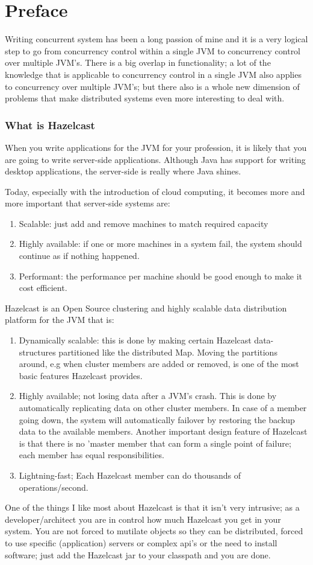 \chapter*{Preface}
Writing concurrent system has been a long passion of mine and it is a very logical step to go from concurrency control within a single JVM to concurrency control over multiple JVM's. There is a big overlap in functionality; a lot of the knowledge that is applicable to concurrency control in a single JVM also applies to concurrency over multiple JVM's; but there also is a whole new dimension of problems that make distributed systems even more interesting to deal with. 
\subsection*{What is Hazelcast}
When you write applications for the JVM for your profession, it is likely that you are going to write server-side applications. Although Java has support for writing desktop applications, the server-side is really where Java shines.

Today, especially with the introduction of cloud computing, it becomes more and more important that server-side systems are:
\begin{enumerate}
\item Scalable: just add and remove machines to match required capacity 
\item Highly available: if one or more machines in a system fail, the system should continue as if nothing happened.
\item Performant: the performance per machine should be good enough to make it cost efficient.
\end{enumerate}

Hazelcast is an Open Source clustering and highly scalable data distribution platform for the JVM that is:
\begin{enumerate}
\item Dynamically scalable: this is done by making certain Hazelcast data-structures partitioned like the distributed Map. Moving the partitions around, e.g when cluster members are added or removed, is one of the most basic features Hazelcast provides. 
\item Highly available; not losing data after a JVM's crash. This is done by automatically replicating data on other cluster members. In case of a member going down, the system will automatically failover by restoring the backup data to the available members. Another important design feature of Hazelcast is that there is no 'master member that can form a single point of failure; each member has equal responsibilities.
\item Lightning-fast; Each Hazelcast member can do thousands of operations/second.
\end{enumerate}
One of the things I like most about Hazelcast is that it isn't very intrusive; as a developer/architect you are in control how much Hazelcast you get in your system. You are not forced to mutilate objects so they can be distributed, forced to use specific (application) servers or complex api's or the need to install software; just add the Hazelcast jar to your classpath and you are done.

